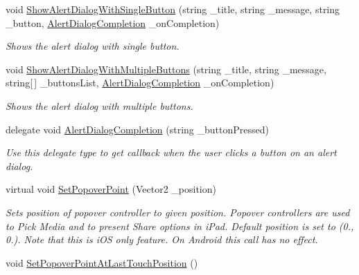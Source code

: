 \begin{DoxyCompactItemize}
\item 
void \hyperlink{class_voxel_busters_1_1_native_plugins_1_1_u_i_a640efb5f4583b0e5a104ea26dff47c26}{Show\+Alert\+Dialog\+With\+Single\+Button} (string \+\_\+title, string \+\_\+message, string \+\_\+button, \hyperlink{class_voxel_busters_1_1_native_plugins_1_1_u_i_a13f3f1e52779c188248ff0f1db247fb5}{Alert\+Dialog\+Completion} \+\_\+on\+Completion)
\begin{DoxyCompactList}\small\item\em Shows the alert dialog with single button. \end{DoxyCompactList}\item 
void \hyperlink{class_voxel_busters_1_1_native_plugins_1_1_u_i_a7c3d280e08154cd2348e104392a24af9}{Show\+Alert\+Dialog\+With\+Multiple\+Buttons} (string \+\_\+title, string \+\_\+message, string\mbox{[}$\,$\mbox{]} \+\_\+buttons\+List, \hyperlink{class_voxel_busters_1_1_native_plugins_1_1_u_i_a13f3f1e52779c188248ff0f1db247fb5}{Alert\+Dialog\+Completion} \+\_\+on\+Completion)
\begin{DoxyCompactList}\small\item\em Shows the alert dialog with multiple buttons. \end{DoxyCompactList}\item 
delegate void \hyperlink{class_voxel_busters_1_1_native_plugins_1_1_u_i_a13f3f1e52779c188248ff0f1db247fb5}{Alert\+Dialog\+Completion} (string \+\_\+button\+Pressed)
\begin{DoxyCompactList}\small\item\em Use this delegate type to get callback when the user clicks a button on an alert dialog. \end{DoxyCompactList}\item 
virtual void \hyperlink{class_voxel_busters_1_1_native_plugins_1_1_u_i_aeae37ed3111f972cab7cc2f95fe8020a}{Set\+Popover\+Point} (Vector2 \+\_\+position)
\begin{DoxyCompactList}\small\item\em Sets position of popover controller to given position. Popover controllers are used to Pick Media and to present Share options in i\+Pad. Default position is set to (0., 0.). Note that this is i\+O\+S only feature. On Android this call has no effect. \end{DoxyCompactList}\item 
void \hyperlink{class_voxel_busters_1_1_native_plugins_1_1_u_i_a6bd0bc0253cdf398318892a9bc72e156}{Set\+Popover\+Point\+At\+Last\+Touch\+Position} ()

\end{DoxyCompactItemize}
